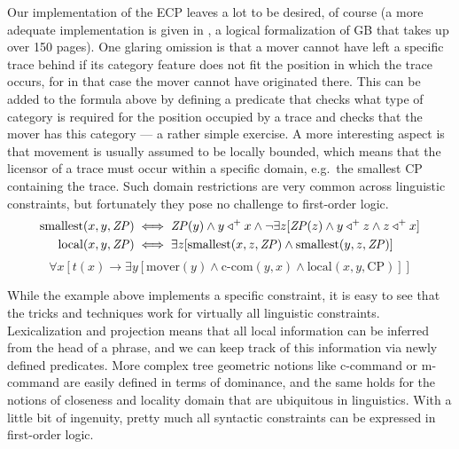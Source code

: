 \begin{examplebox}
    Our implementation of the ECP leaves a lot to be desired, of course (a more adequate implementation is given in \citealt{Rogers98}, a logical formalization of GB that takes up over 150 pages).
    One glaring omission is that a mover cannot have left a specific trace behind if its category feature does not fit the position in which the trace occurs, for in that case the mover cannot have originated there.
    This can be added to the formula above by defining a predicate that checks what type of category is required for the position occupied by a trace and checks that the mover has this category --- a rather simple exercise.
    A more interesting aspect is that movement is usually assumed to be locally bounded, which means that the licensor of a trace must occur within a specific domain, e.g.\ the smallest CP containing the trace.
    Such domain restrictions are very common across linguistic constraints, but fortunately they pose no challenge to first-order logic.
    \begin{align*}
        \mathrm{smallest}(x,y,\mathit{ZP}) & \iff
                \mathit{ZP}(y)
                \wedge
                y \triangleleft^+ x
                \wedge
                \neg \exists z
                    [
                    \mathit{ZP}(z)
                    \wedge
                    y \triangleleft^+ z
                    \wedge
                    z \triangleleft^+ x
                    ]
                \\
        \mathrm{local}(x,y,\mathit{ZP}) & \iff
            \exists z
                [
                \mathrm{smallest}(x,z,\mathit{ZP})
                \wedge
                \mathrm{smallest}(y,z,\mathit{ZP})
                ]
    \end{align*}
    \[
        \forall x [
            t(x) \rightarrow
                \exists y
                    [
                    \mathrm{mover}(y)
                    \wedge
                    \text{c-com}(y,x)
                    \wedge
                    \mathrm{local}(x,y,\mathrm{CP})
                ]
        ]
    \]
\end{examplebox}

While the example above implements a specific constraint, it is easy to see that the tricks and techniques work for virtually all linguistic constraints.
Lexicalization and projection means that all local information can be inferred from the head of a phrase, and we can keep track of this information via newly defined predicates.
More complex tree geometric notions like c-command or m-command are easily defined in terms of dominance, and the same holds for the notions of closeness and locality domain that are ubiquitous in linguistics.
With a little bit of ingenuity, pretty much all syntactic constraints can be expressed in first-order logic.

